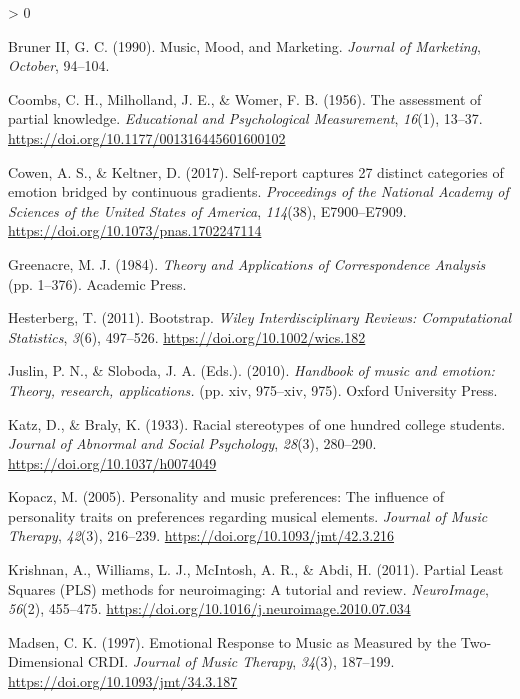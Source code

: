 \documentclass[
  english,
  man,floatsintext]{apa6}
\newlength{\cslhangindent}
\newenvironment{CSLReferences}[2] %
 {%
  \setlength{\parindent}{0pt}
  \ifodd #1 \everypar{\setlength{\hangindent}{\cslhangindent}}\ignorespaces\fi
  \ifnum #2 > 0
  \setlength{\parskip}{#2\baselineskip}
  \fi
 }%
 {}
\begin{document}
\begin{CSLReferences}{1}{0}
\leavevmode\hypertarget{ref-BrunerII1990}{}%
Bruner II, G. C. (1990). {Music, Mood, and Marketing}. \emph{Journal of Marketing}, \emph{October}, 94--104.

\leavevmode\hypertarget{ref-Coombs1956}{}%
Coombs, C. H., Milholland, J. E., \& Womer, F. B. (1956). {The assessment of partial knowledge}. \emph{Educational and Psychological Measurement}, \emph{16}(1), 13--37. \url{https://doi.org/10.1177/001316445601600102}

\leavevmode\hypertarget{ref-Cowen2017}{}%
Cowen, A. S., \& Keltner, D. (2017). {Self-report captures 27 distinct categories of emotion bridged by continuous gradients}. \emph{Proceedings of the National Academy of Sciences of the United States of America}, \emph{114}(38), E7900--E7909. \url{https://doi.org/10.1073/pnas.1702247114}

\leavevmode\hypertarget{ref-Greenacre1984}{}%
Greenacre, M. J. (1984). \emph{{Theory and Applications of Correspondence Analysis}} (pp. 1--376). Academic Press.

\leavevmode\hypertarget{ref-Hesterberg2011}{}%
Hesterberg, T. (2011). {Bootstrap}. \emph{Wiley Interdisciplinary Reviews: Computational Statistics}, \emph{3}(6), 497--526. \url{https://doi.org/10.1002/wics.182}

\leavevmode\hypertarget{ref-Juslin2010}{}%
Juslin, P. N., \& Sloboda, J. A. (Eds.). (2010). \emph{{Handbook of music and emotion: Theory, research, applications.}} (pp. xiv, 975--xiv, 975). Oxford University Press.

\leavevmode\hypertarget{ref-Katz1933}{}%
Katz, D., \& Braly, K. (1933). {Racial stereotypes of one hundred college students}. \emph{Journal of Abnormal and Social Psychology}, \emph{28}(3), 280--290. \url{https://doi.org/10.1037/h0074049}

\leavevmode\hypertarget{ref-Kopacz2005}{}%
Kopacz, M. (2005). {Personality and music preferences: The influence of personality traits on preferences regarding musical elements}. \emph{Journal of Music Therapy}, \emph{42}(3), 216--239. \url{https://doi.org/10.1093/jmt/42.3.216}

\leavevmode\hypertarget{ref-Krishnan2011}{}%
Krishnan, A., Williams, L. J., McIntosh, A. R., \& Abdi, H. (2011). {Partial Least Squares (PLS) methods for neuroimaging: A tutorial and review}. \emph{NeuroImage}, \emph{56}(2), 455--475. \url{https://doi.org/10.1016/j.neuroimage.2010.07.034}

\leavevmode\hypertarget{ref-Madsen1997}{}%
Madsen, C. K. (1997). {Emotional Response to Music as Measured by the Two-Dimensional CRDI}. \emph{Journal of Music Therapy}, \emph{34}(3), 187--199. \url{https://doi.org/10.1093/jmt/34.3.187}


\end{CSLReferences}
\end{document}
